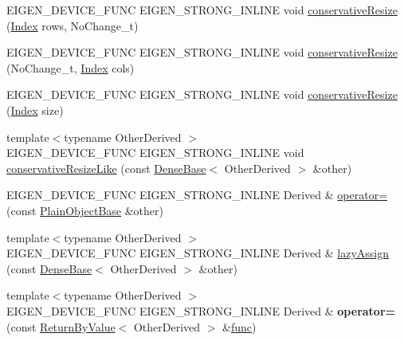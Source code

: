 \begin{DoxyCompactItemize}
\item 
E\+I\+G\+E\+N\+\_\+\+D\+E\+V\+I\+C\+E\+\_\+\+F\+U\+NC E\+I\+G\+E\+N\+\_\+\+S\+T\+R\+O\+N\+G\+\_\+\+I\+N\+L\+I\+NE void \hyperlink{class_eigen_1_1_plain_object_base_a528879aef40f9cbc4ab4925e4a6bceb9}{conservative\+Resize} (\hyperlink{namespace_eigen_a62e77e0933482dafde8fe197d9a2cfde}{Index} rows, No\+Change\+\_\+t)
\item 
E\+I\+G\+E\+N\+\_\+\+D\+E\+V\+I\+C\+E\+\_\+\+F\+U\+NC E\+I\+G\+E\+N\+\_\+\+S\+T\+R\+O\+N\+G\+\_\+\+I\+N\+L\+I\+NE void \hyperlink{class_eigen_1_1_plain_object_base_a46afa73816539b0fe36c6e9abd7978a6}{conservative\+Resize} (No\+Change\+\_\+t, \hyperlink{namespace_eigen_a62e77e0933482dafde8fe197d9a2cfde}{Index} cols)
\item 
E\+I\+G\+E\+N\+\_\+\+D\+E\+V\+I\+C\+E\+\_\+\+F\+U\+NC E\+I\+G\+E\+N\+\_\+\+S\+T\+R\+O\+N\+G\+\_\+\+I\+N\+L\+I\+NE void \hyperlink{class_eigen_1_1_plain_object_base_a5429214e7c1ffaf7294a93a5cec62007}{conservative\+Resize} (\hyperlink{namespace_eigen_a62e77e0933482dafde8fe197d9a2cfde}{Index} size)
\item 
{\footnotesize template$<$typename Other\+Derived $>$ }\\E\+I\+G\+E\+N\+\_\+\+D\+E\+V\+I\+C\+E\+\_\+\+F\+U\+NC E\+I\+G\+E\+N\+\_\+\+S\+T\+R\+O\+N\+G\+\_\+\+I\+N\+L\+I\+NE void \hyperlink{class_eigen_1_1_plain_object_base_a7775d274035c4ef541aa0fc9a3ad30a2}{conservative\+Resize\+Like} (const \hyperlink{group___core___module_class_eigen_1_1_dense_base}{Dense\+Base}$<$ Other\+Derived $>$ \&other)
\item 
E\+I\+G\+E\+N\+\_\+\+D\+E\+V\+I\+C\+E\+\_\+\+F\+U\+NC E\+I\+G\+E\+N\+\_\+\+S\+T\+R\+O\+N\+G\+\_\+\+I\+N\+L\+I\+NE Derived \& \hyperlink{class_eigen_1_1_plain_object_base_a75308f8a23a03f045a1260611e2054a0}{operator=} (const \hyperlink{class_eigen_1_1_plain_object_base}{Plain\+Object\+Base} \&other)
\item 
{\footnotesize template$<$typename Other\+Derived $>$ }\\E\+I\+G\+E\+N\+\_\+\+D\+E\+V\+I\+C\+E\+\_\+\+F\+U\+NC E\+I\+G\+E\+N\+\_\+\+S\+T\+R\+O\+N\+G\+\_\+\+I\+N\+L\+I\+NE Derived \& \hyperlink{class_eigen_1_1_plain_object_base_a6008cee3b716d514b3e14c1bc7c0d34a}{lazy\+Assign} (const \hyperlink{group___core___module_class_eigen_1_1_dense_base}{Dense\+Base}$<$ Other\+Derived $>$ \&other)
\item 
\mbox{\label{class_eigen_1_1_plain_object_base_a1682d60af2dd00c27507043aade71556}} 
{\footnotesize template$<$typename Other\+Derived $>$ }\\E\+I\+G\+E\+N\+\_\+\+D\+E\+V\+I\+C\+E\+\_\+\+F\+U\+NC E\+I\+G\+E\+N\+\_\+\+S\+T\+R\+O\+N\+G\+\_\+\+I\+N\+L\+I\+NE Derived \& {\bfseries operator=} (const \hyperlink{group___core___module_class_eigen_1_1_return_by_value}{Return\+By\+Value}$<$ Other\+Derived $>$ \&\hyperlink{structfunc}{func})

\end{DoxyCompactItemize}
